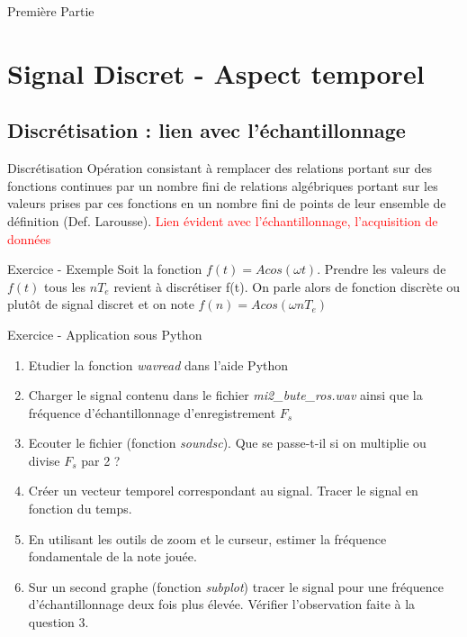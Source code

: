 \documentclass{beamer}
\newcounter{exampleBlockCounter}
\begin{document}
\begin{frame}{Première Partie}
	\tableofcontents
\end{frame}

\section{Signal Discret - Aspect temporel}
\subsection{Discrétisation : lien avec l'échantillonnage}
\begin{frame}
\begin{block}{Discrétisation}
\justifying
Opération consistant à remplacer des relations portant sur des fonctions
continues par un nombre fini de relations algébriques 
portant sur les valeurs prises par ces fonctions en un nombre fini de points
 de leur ensemble de définition (Def. Larousse).
 \smallbreak
 \center
 \textcolor{red}{Lien évident avec l'échantillonnage, l'acquisition de données}
\end{block}
\pause
\begin{exampleblock}{Exercice  - Exemple}
\justifying
Soit la fonction $f(t) = Acos(\omega t)$. Prendre les valeurs de $f(t)$ tous les
$nT_{e}$ revient à discrétiser f(t). On parle alors de fonction discrète ou
plutôt de signal discret et on note $f(n) = Acos(\omega nT_{e})$
\end{exampleblock}
\end{frame}
\begin{frame}
	\begin{exampleblock}{Exercice  - Application sous Python}
		\begin{enumerate}\justifying
			  \item Etudier la fonction \textit{wavread} dans l'aide Python
			  \item Charger le signal contenu dans le fichier \textit{mi2\_bute\_ros.wav} ainsi que la fréquence d'échantillonnage d'enregistrement $F_{s}$
			  \item Ecouter le fichier (fonction \textit{soundsc}).  Que se passe-t-il si on multiplie ou divise $F_{s}$ par 2 ?
			  \item Créer un vecteur temporel correspondant au signal. Tracer le signal en fonction du temps.
			  \item En utilisant les outils de zoom et le curseur, estimer la fréquence fondamentale de la note jouée.
			  \item Sur un second graphe (fonction \textit{subplot}) tracer le signal pour une fréquence d'échantillonnage deux fois plus élevée. Vérifier l'observation faite à la question 3.   
		\end{enumerate}
	\end{exampleblock}
\end{frame}
\end{document}
